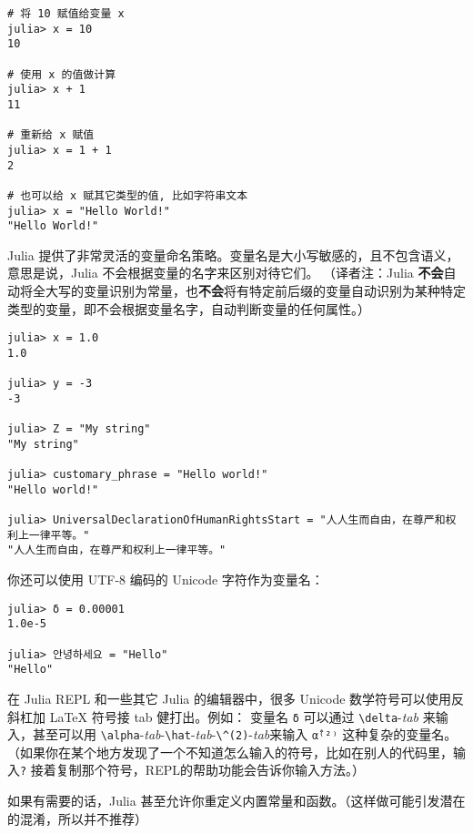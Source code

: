 \begin{verbatim}
# 将 10 赋值给变量 x
julia> x = 10
10

# 使用 x 的值做计算
julia> x + 1
11

# 重新给 x 赋值
julia> x = 1 + 1
2

# 也可以给 x 赋其它类型的值, 比如字符串文本
julia> x = "Hello World!"
"Hello World!"
\end{verbatim}



Julia 提供了非常灵活的变量命名策略。变量名是大小写敏感的，且不包含语义，意思是说，Julia 不会根据变量的名字来区别对待它们。 （译者注：Julia \textbf{不会}自动将全大写的变量识别为常量，也\textbf{不会}将有特定前后缀的变量自动识别为某种特定类型的变量，即不会根据变量名字，自动判断变量的任何属性。）




\begin{verbatim}
julia> x = 1.0
1.0

julia> y = -3
-3

julia> Z = "My string"
"My string"

julia> customary_phrase = "Hello world!"
"Hello world!"

julia> UniversalDeclarationOfHumanRightsStart = "人人生而自由，在尊严和权利上一律平等。"
"人人生而自由，在尊严和权利上一律平等。"
\end{verbatim}



你还可以使用 UTF-8 编码的 Unicode 字符作为变量名：




\begin{verbatim}
julia> δ = 0.00001
1.0e-5

julia> 안녕하세요 = "Hello"
"Hello"
\end{verbatim}



在 Julia REPL 和一些其它 Julia 的编辑器中，很多 Unicode 数学符号可以使用反斜杠加 LaTeX 符号接 tab 健打出。例如： 变量名 \texttt{δ} 可以通过 \texttt{{\textbackslash}delta}-\emph{tab} 来输入，甚至可以用 \texttt{{\textbackslash}alpha}-\emph{tab}-\texttt{{\textbackslash}hat}-\emph{tab}-\texttt{{\textbackslash}{\textasciicircum}(2)}-\emph{tab}来输入 \texttt{α̂⁽²⁾} 这种复杂的变量名。（如果你在某个地方发现了一个不知道怎么输入的符号，比如在别人的代码里，输入\texttt{?} 接着复制那个符号，REPL的帮助功能会告诉你输入方法。）



如果有需要的话，Julia 甚至允许你重定义内置常量和函数。（这样做可能引发潜在的混淆，所以并不推荐）




